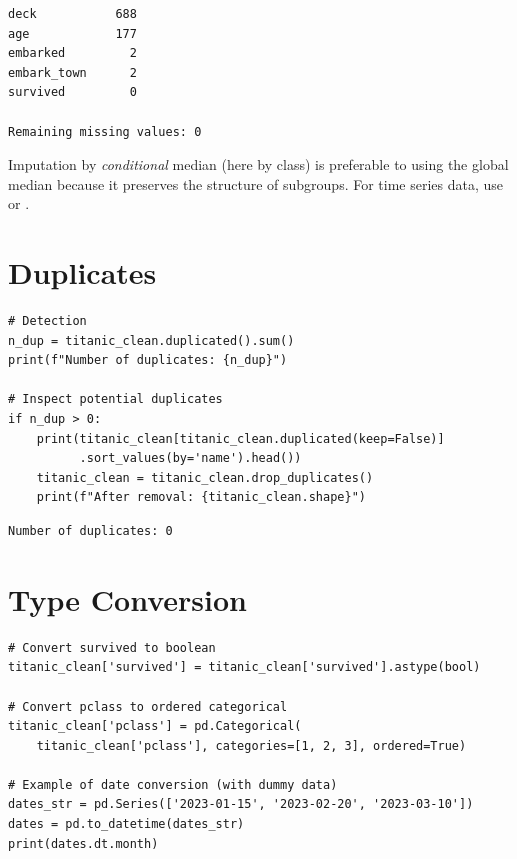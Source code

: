 \begin{codeoutput}
\begin{verbatim}
deck           688
age            177
embarked         2
embark_town      2
survived         0

Remaining missing values: 0
\end{verbatim}
\end{codeoutput}

\begin{bestpractice}
Imputation by \emph{conditional} median (here by class) is preferable to using the global median because it preserves the structure of subgroups. For time series data, use  or .
\end{bestpractice}

\section{Duplicates}

\begin{codeblock}[title=\textbf{Python}]
\begin{verbatim}
# Detection
n_dup = titanic_clean.duplicated().sum()
print(f"Number of duplicates: {n_dup}")

# Inspect potential duplicates
if n_dup > 0:
    print(titanic_clean[titanic_clean.duplicated(keep=False)]
          .sort_values(by='name').head())
    titanic_clean = titanic_clean.drop_duplicates()
    print(f"After removal: {titanic_clean.shape}")
\end{verbatim}
\end{codeblock}

\begin{codeoutput}
\begin{verbatim}
Number of duplicates: 0
\end{verbatim}
\end{codeoutput}

\section{Type Conversion}

\begin{codeblock}[title=\textbf{Python}]
\begin{verbatim}
# Convert survived to boolean
titanic_clean['survived'] = titanic_clean['survived'].astype(bool)

# Convert pclass to ordered categorical
titanic_clean['pclass'] = pd.Categorical(
    titanic_clean['pclass'], categories=[1, 2, 3], ordered=True)

# Example of date conversion (with dummy data)
dates_str = pd.Series(['2023-01-15', '2023-02-20', '2023-03-10'])
dates = pd.to_datetime(dates_str)
print(dates.dt.month)
\end{verbatim}
\end{codeblock}

